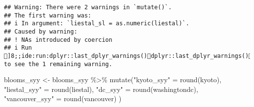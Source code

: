 \documentclass[
]{article}
\newenvironment{Shaded}{\begin{snugshade}}{\end{snugshade}}
\newcommand{\FunctionTok}[1]{\textcolor[rgb]{0.00,0.00,0.00}{#1}}
\newcommand{\NormalTok}[1]{#1}
\newcommand{\OtherTok}[1]{\textcolor[rgb]{0.56,0.35,0.01}{#1}}
\newcommand{\SpecialCharTok}[1]{\textcolor[rgb]{0.00,0.00,0.00}{#1}}
\newcommand{\StringTok}[1]{\textcolor[rgb]{0.31,0.60,0.02}{#1}}
\begin{document}
\begin{verbatim}
## Warning: There were 2 warnings in `mutate()`.
## The first warning was:
## i In argument: `liestal_sl = as.numeric(liestal)`.
## Caused by warning:
## ! NAs introduced by coercion
## i Run ]8;;ide:run:dplyr::last_dplyr_warnings()dplyr::last_dplyr_warnings()]8;; to see the 1 remaining warning.
\end{verbatim}

\begin{Shaded}
\begin{Highlighting}[]
\NormalTok{blooms\_syy }\OtherTok{\textless{}{-}}\NormalTok{ blooms\_syy }\SpecialCharTok{\%\textgreater{}\%} \FunctionTok{mutate}\NormalTok{(}\StringTok{"kyoto\_syy"} \OtherTok{=} \FunctionTok{round}\NormalTok{(kyoto),}
                                  \StringTok{"liestal\_syy"} \OtherTok{=} \FunctionTok{round}\NormalTok{(liestal),}
                                  \StringTok{"dc\_syy"} \OtherTok{=} \FunctionTok{round}\NormalTok{(washingtondc),}
                                  \StringTok{"vancouver\_syy"} \OtherTok{=} \FunctionTok{round}\NormalTok{(vancouver)}
\NormalTok{)}
\end{Highlighting}
\end{Shaded}
\end{document}
